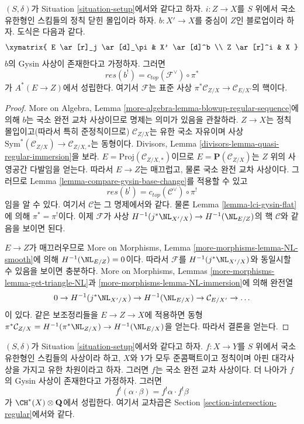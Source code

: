 \begin{lemma}[블로업 공식]
\label{lemma-blow-up-formula}
$(S, \delta)$가 Situation \ref{situation-setup}에서와 같다고 하자.
$i : Z \to X$를 $S$ 위에서 국소 유한형인 스킴들의 정칙 닫힌
몰입이라 하자. $b : X' \to X$를 중심이 $Z$인 블로업이라 하자. 도식은
다음과 같다.
$$
\xymatrix{
E \ar[r]_j \ar[d]_\pi & X' \ar[d]^b \\
Z \ar[r]^i & X
}
$$
$b$의 Gysin 사상이 존재한다고 가정하자. 그러면
$$
res(b^!) = c_{top}(\mathcal{F}^\vee) \circ \pi^*
$$
가 $A^*(E \to Z)$에서 성립한다. 여기서 $\mathcal{F}$는 표준 사상
$\pi^*\mathcal{C}_{Z/X} \to \mathcal{C}_{E/X'}$의 핵이다.
\end{lemma}

\begin{proof}
More on Algebra, Lemma
\ref{more-algebra-lemma-blowup-regular-sequence}에 의해 $b$는 국소 완전
교차 사상이므로 명제는 의미가 있음을 관찰하라. $Z \to X$는 정칙
몰입이고(따라서 특히 준정칙이므로) $\mathcal{C}_{Z/X}$는 유한 국소
자유이며 사상
$\text{Sym}^*(\mathcal{C}_{Z/X}) \to \mathcal{C}_{Z/X, *}$는 동형이다.
Divisors, Lemma \ref{divisors-lemma-quasi-regular-immersion}을 보라.
$E = \text{Proj}(\mathcal{C}_{Z/X, *})$이므로
$E = \mathbf{P}(\mathcal{C}_{Z/X})$는 $Z$ 위의 사영공간 다발임을
얻는다. 따라서 $E \to Z$는 매끄럽고, 물론 국소 완전 교차 사상이다.
그러므로 Lemma \ref{lemma-compare-gysin-base-change}를 적용할 수 있고
$$
res(b^!) = c_{top}(\mathcal{C}^\vee) \circ \pi^!
$$
임을 알 수 있다. 여기서 $\mathcal{C}$는 그 명제에서와 같다. 물론
Lemma \ref{lemma-lci-gysin-flat}에 의해 $\pi^* = \pi^!$이다. 이제
$\mathcal{F}$가 사상
$H^{-1}(j^*\NL_{X'/X}) \to H^{-1}(\NL_{E/Z})$의 핵 $\mathcal{C}$와
같음을 보이면 된다.

\medskip\noindent
$E \to Z$가 매끄러우므로 More on Morphisms, Lemma
\ref{more-morphisms-lemma-NL-smooth}에 의해
$H^{-1}(\NL_{E/Z}) = 0$이다. 따라서 $\mathcal{F}$를
$H^{-1}(j^*\NL_{X'/X})$와 동일시할 수 있음을 보이면 충분하다. More on
Morphisms, Lemmas \ref{more-morphisms-lemma-get-triangle-NL}과
\ref{more-morphisms-lemma-NL-immersion}에 의해 완전열
$$
0 \to H^{-1}(j^*\NL_{X'/X}) \to H^{-1}(\NL_{E/X}) \to
\mathcal{C}_{E/X'} \to \ldots
$$
이 있다. 같은 보조정리들을 $E \to Z \to X$에 적용하면 동형
$\pi^*\mathcal{C}_{Z/X} = H^{-1}(\pi^*\NL_{Z/X}) \to H^{-1}(\NL_{E/X})$을
얻는다. 따라서 결론을 얻는다.
\end{proof}

\begin{lemma}
\label{lemma-lci-gysin-product-regular}
$(S, \delta)$가 Situation \ref{situation-setup}에서와 같다고 하자.
$f : X \to Y$를 $S$ 위에서 국소 유한형인 스킴들의 사상이라 하고,
$X$와 $Y$가 모두 준콤팩트이고 정칙이며 아핀 대각사상을 가지고 유한
차원이라고 하자. 그러면 $f$는 국소 완전 교차 사상이다. 더 나아가
$f$의 Gysin 사상이 존재한다고 가정하자. 그러면
$$
f^!(\alpha \cdot \beta) = f^!\alpha \cdot f^!\beta
$$
가 $\CH^*(X) \otimes \mathbf{Q}$에서 성립한다. 여기서 교차곱은 Section
\ref{section-intersection-regular}에서와 같다.
\end{lemma}

